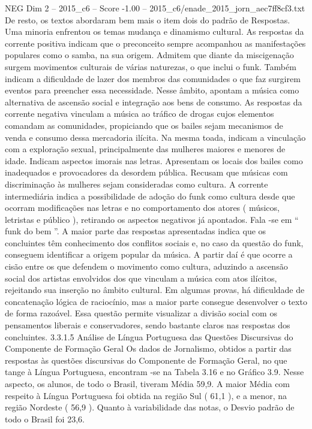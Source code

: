 \begin{textsample}{NEG Dim 2 – 2015\_c6 – Score -1.00 – 2015\_c6/enade\_2015\_jorn\_aec7ff8cf3.txt}
De resto, os textos abordaram bem mais o item dois do padrão de Respostas.
Uma minoria enfrentou os temas mudança e dinamismo cultural.
As respostas da corrente positiva indicam que o preconceito sempre acompanhou as manifestações populares como o samba, na sua origem.
Admitem que diante da miscigenação surgem movimentos culturais de várias naturezas, o que inclui o funk.
Também indicam a dificuldade de lazer dos membros das comunidades o que faz surgirem eventos para preencher essa necessidade.
Nesse âmbito, apontam a música como alternativa de ascensão social e integração aos bens de consumo.
As respostas da corrente negativa vinculam a música ao tráfico de drogas cujos elementos comandam as comunidades, propiciando que os bailes sejam mecanismos de venda e consumo dessa mercadoria ilícita.
Na mesma toada, indicam a vinculação com a exploração sexual, principalmente das mulheres maiores e menores de idade.
Indicam aspectos imorais nas letras.
Apresentam os locais dos bailes como inadequados e provocadores da desordem pública.
Recusam que músicas com discriminação às mulheres sejam consideradas como cultura.
A corrente intermediária indica a possibilidade de adoção do funk como cultura desde que ocorram modificações nas letras e no comportamento dos atores ( músicos, letristas e público ), retirando os aspectos negativos já apontados.
Fala -se em “ funk do bem ”.
A maior parte das respostas apresentadas indica que os concluintes têm conhecimento dos conflitos sociais e, no caso da questão do funk, conseguem identificar a origem popular da música.
A partir daí é que ocorre a cisão entre os que defendem o movimento como cultura, aduzindo a ascensão social dos artistas envolvidos dos que vinculam a música com atos ilícitos, rejeitando sua inserção no âmbito cultural.
Em algumas provas, há dificuldade de concatenação lógica de raciocínio, mas a maior parte consegue desenvolver o texto de forma razoável.
Essa questão permite visualizar a divisão social com os pensamentos liberais e conservadores, sendo bastante claros nas respostas dos concluintes. 3.3.1.5 Análise de Língua Portuguesa das Questões Discursivas do Componente de Formação Geral Os dados de Jornalismo, obtidos a partir das respostas às questões discursivas do Componente de Formação Geral, no que tange à Língua Portuguesa, encontram -se na Tabela 3.16 e no Gráfico 3.9.
Nesse aspecto, os alunos, de todo o Brasil, tiveram Média 59,9.
A maior Média com respeito à Língua Portuguesa foi obtida na região Sul ( 61,1 ), e a menor, na região Nordeste ( 56,9 ).
Quanto à variabilidade das notas, o Desvio padrão de todo o Brasil foi 23,6.

\end{textsample}
